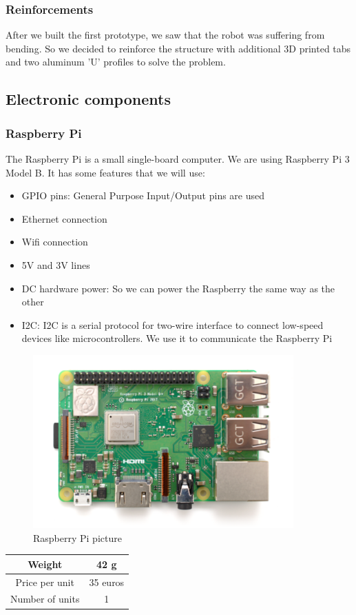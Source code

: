 \subsubsection{Reinforcements}
After we built the first prototype, we saw that the robot was suffering
from bending. So we decided to reinforce the structure with additional 3D
printed tabs and two aluminum 'U' profiles to solve the problem.

\subsection{Electronic components}
\subsubsection{Raspberry Pi}
The Raspberry Pi is a small single-board computer.
We are using Raspberry Pi 3 Model B. It has some features that we will use:
\begin{itemize}
    \item GPIO pins: General Purpose Input/Output pins are used
    \item Ethernet connection
    \item Wifi connection
    \item 5V and 3V lines
    \item DC hardware power: So we can power the Raspberry the same way as the
          other
    \item I2C: I2C is a serial protocol for two-wire interface to
          connect low-speed devices like microcontrollers. We use it to communicate
          the Raspberry Pi
\end{itemize}
\begin{figure}[H]
    \centering
    \includegraphics[width=10cm]{img/components/raspberry_pi.png}
    \caption{Raspberry Pi picture}
    \label{fig:}
\end{figure}
\begin{center}
    \begin{tabular}{ |c|c| }
        \hline
        Weight          & 42 g     \\
        \hline
        Price per unit  & 35 euros \\
        \hline
        Number of units & 1        \\
        \hline
    \end{tabular}
\end{center}
